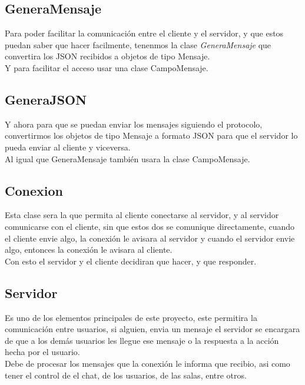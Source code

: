 \documentclass[12pt]{report}
\begin{document}
\subsection{GeneraMensaje}
Para poder facilitar la comunicación entre el cliente y el servidor, y que estos puedan saber que hacer facilmente, tenenmos la clase \textit{GeneraMensaje} que convertira los JSON recibidos a objetos de tipo Mensaje.\\

Y para facilitar el acceso usar una clase CampoMensaje.\\

\subsection{GeneraJSON}
Y ahora para que se puedan enviar los mensajes siguiendo el protocolo, convertirmos los objetos de tipo Mensaje a formato JSON para que el servidor lo pueda enviar al cliente y viceversa.\\

Al igual que GeneraMensaje también usara la clase CampoMensaje.\\

\subsection{Conexion}
Esta clase sera la que permita al cliente conectarse al servidor, y al servidor comunicarse con el cliente, sin que estos dos se comunique directamente, cuando el cliente envie algo, la conexión le avisara al servidor y cuando el servidor envie algo, entonces la conexión le avisara al cliente.\\

Con esto el servidor y el cliente decidiran que hacer, y que responder.\\

\subsection{Servidor}
Es uno de los elementos principales de este proyecto, este permitira la comunicación entre usuarios, si alguien, envia un mensaje el servidor se encargara de que a los demás usuarios les llegue ese mensaje o la respuesta a la acción hecha por el usuario.\\

Debe de procesar los mensajes que la conexión le informa que recibio, asi como tener el control de el chat, de los usuarios, de las salas, entre otros.\\
\end{document}
